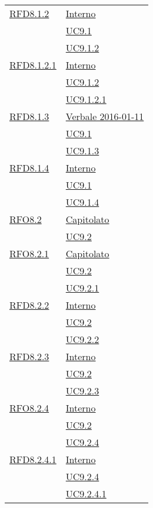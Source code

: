\begin{longtable}{|>{\centering}m{5cm}|m{5cm}<{\centering}|}
\hyperlink{RFD8.1.2}{RFD8.1.2} & \hyperlink{Interno}{Interno}\\
& \hyperref[UC9.1]{UC9.1}\\
& \hyperref[UC9.1.2]{UC9.1.2}\\ \hline

\hyperlink{RFD8.1.2.1}{RFD8.1.2.1} & \hyperlink{Interno}{Interno}\\
& \hyperref[UC9.1.2]{UC9.1.2}\\
& \hyperref[UC9.1.2.1]{UC9.1.2.1}\\ \hline

\hyperlink{RFD8.1.3}{RFD8.1.3} & \hyperlink{Verbale 2016-01-11}{Verbale 2016-01-11}\\
& \hyperref[UC9.1]{UC9.1}\\
& \hyperref[UC9.1.3]{UC9.1.3}\\ \hline

\hyperlink{RFD8.1.4}{RFD8.1.4} & \hyperlink{Interno}{Interno}\\
& \hyperref[UC9.1]{UC9.1}\\
& \hyperref[UC9.1.4]{UC9.1.4}\\ \hline

\hyperlink{RFO8.2}{RFO8.2} & \hyperlink{Capitolato}{Capitolato}\\
& \hyperref[UC9.2]{UC9.2}\\ \hline

\hyperlink{RFO8.2.1}{RFO8.2.1} & \hyperlink{Capitolato}{Capitolato}\\
& \hyperref[UC9.2]{UC9.2}\\
& \hyperref[UC9.2.1]{UC9.2.1}\\ \hline

\hyperlink{RFD8.2.2}{RFD8.2.2} & \hyperlink{Interno}{Interno}\\
& \hyperref[UC9.2]{UC9.2}\\
& \hyperref[UC9.2.2]{UC9.2.2}\\ \hline

\hyperlink{RFD8.2.3}{RFD8.2.3} & \hyperlink{Interno}{Interno}\\
& \hyperref[UC9.2]{UC9.2}\\
& \hyperref[UC9.2.3]{UC9.2.3}\\ \hline

\hyperlink{RFO8.2.4}{RFO8.2.4} & \hyperlink{Interno}{Interno}\\
& \hyperref[UC9.2]{UC9.2}\\
& \hyperref[UC9.2.4]{UC9.2.4}\\ \hline

\hyperlink{RFD8.2.4.1}{RFD8.2.4.1} & \hyperlink{Interno}{Interno}\\
& \hyperref[UC9.2.4]{UC9.2.4}\\
& \hyperref[UC9.2.4.1]{UC9.2.4.1}\\ \hline


\end{longtable}
